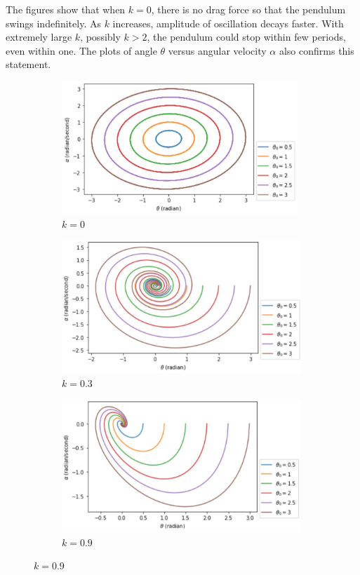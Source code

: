 \documentclass{article}
\begin{document}
\noindent The figures show that when $k=0$, there is no drag force so that the pendulum swings indefinitely. As $k$ increases, amplitude of oscillation decays faster. With extremely large $k$, possibly $k>2$, the pendulum could stop within few periods, even within one. The plots of angle $\theta$ versus angular velocity $\alpha$ also confirms this statement.
\begin{figure}[H]
\begin{subfigure}{0.5\textwidth}
\includegraphics[width=0.9\linewidth, height=5cm]{AlphaThetaK0.jpg} 
\caption{$k=0$}
\label{fig:subim1}
\end{subfigure}
\begin{subfigure}{0.5\textwidth}
\includegraphics[width=0.9\linewidth, height=5cm]{AlphaThetaK03.jpg}
\caption{$k=0.3$}
\label{fig:subim2}
\end{subfigure}
\begin{subfigure}{0.5\textwidth}
\includegraphics[width=0.9\linewidth, height=5cm]{AlphaThetaK09.jpg} 
\caption{$k=0.9$}
\label{fig:subim3}
\end{subfigure}

\end{figure}
\end{document}
